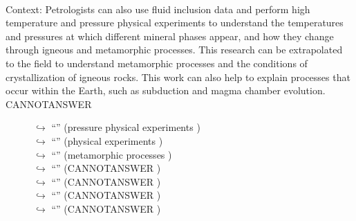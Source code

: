 \documentclass[11pt,a4paper, onecolumn]{article}
\begin{document}
\\ Context: Petrologists can also use fluid inclusion data and perform high temperature and pressure physical experiments to understand the temperatures and pressures at which different mineral phases appear, and how they change through igneous and metamorphic processes. This research can be extrapolated to the field to understand metamorphic processes and the conditions of crystallization of igneous rocks. This work can also help to explain processes that occur within the Earth, such as subduction and magma chamber evolution. CANNOTANSWER

\begin{figure}[t] \small \begin{tcolorbox}[boxsep=0pt,left=5pt,right=0pt,top=2pt,colback = yellow!5] \begin{dialogue}
 \small 
\colorbox{pink!25}{$\hookrightarrow$}
{ ``'' (pressure physical experiments ) }
\\
\colorbox{pink!25}{$\hookrightarrow$}
{ ``'' (physical experiments ) }
\\
\colorbox{pink!25}{$\hookrightarrow$}
{ ``'' (metamorphic processes ) }
\\
\colorbox{pink!25}{$\hookrightarrow$}
{ ``'' (CANNOTANSWER ) }
\\
\colorbox{pink!25}{$\hookrightarrow$}
{ ``'' (CANNOTANSWER ) }
\\
\colorbox{pink!25}{$\hookrightarrow$}
{ ``'' (CANNOTANSWER ) }
\\
\colorbox{pink!25}{$\hookrightarrow$}
{ ``'' (CANNOTANSWER ) }
\\

\end{dialogue}
\end{tcolorbox}
\end{figure}
\end{document}
